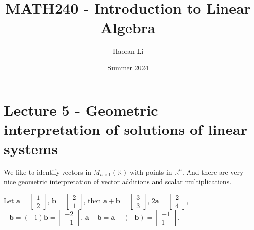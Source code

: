 \documentclass{beamer}
\title{MATH240 - Introduction to Linear Algebra}
\author{Haoran Li}
\institute[UMD]{University of Maryland, College Park}
\date{Summer 2024}
\theoremstyle{definition}
\theoremstyle{remark}
\begin{document}
\maketitle

\section{Lecture 5 - Geometric interpretation of solutions of linear systems}

\begin{frame}[t]
We like to identify vectors in $M_{n\times1}(\mathbb R)$ with points in $\mathbb R^n$. And there are very nice geometric interpretation of vector additions and scalar multiplications.
\end{frame}

\begin{frame}[t]
\begin{example}[Vector-point correspondence in the case of $n=2$]
Let $\mathbf a=\begin{bmatrix}
1\\2
\end{bmatrix}$, $\mathbf b=\begin{bmatrix}
2\\1
\end{bmatrix}$, then $\mathbf a+\mathbf b=\begin{bmatrix}
3\\3
\end{bmatrix}$, $2\mathbf a=\begin{bmatrix}
2\\4
\end{bmatrix}$, $-\mathbf b=(-1)\mathbf b=\begin{bmatrix}
-2\\-1
\end{bmatrix}$, $\mathbf a-\mathbf b=\mathbf a+(-\mathbf b)=\begin{bmatrix}
-1\\1
\end{bmatrix}$.
\begin{overlayarea}{\textwidth}{0.9\textheight}
\end{overlayarea}
\end{example}
\end{frame}
\end{document}
